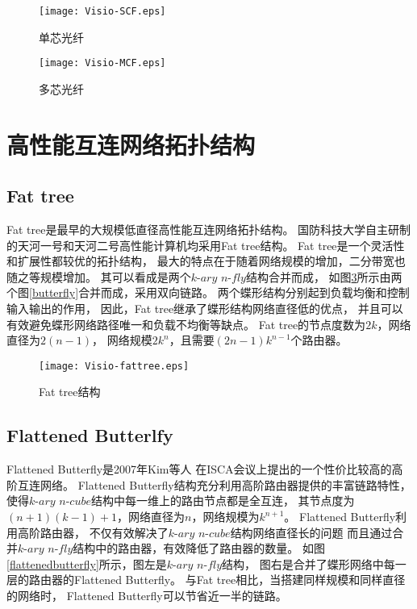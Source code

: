\begin{figure}[htp]
  \centering
    \texttt{[image: Visio-SCF.eps]}
    \caption{单芯光纤}
    \label{scf}
\end{figure}

\begin{figure}[htp]
  \centering
    \texttt{[image: Visio-MCF.eps]}
      \caption{多芯光纤}
       \label{mcf}
\end{figure}

\section{高性能互连网络拓扑结构}

\subsection{Fat tree}
Fat tree是最早的大规模低直径高性能互连网络拓扑结构。
国防科技大学自主研制的天河一号和天河二号高性能计算机均采用Fat tree结构。
Fat tree是一个灵活性和扩展性都较优的拓扑结构，
最大的特点在于随着网络规模的增加，二分带宽也随之等规模增加。
其可以看成是两个$k\textrm{-}ary$ $n\textrm{-}fly$结构合并而成，
如图\ref{fattree}所示由两个图\ref{butterfly}合并而成，采用双向链路。
两个蝶形结构分别起到负载均衡和控制输入输出的作用，
因此，Fat tree继承了蝶形结构网络直径低的优点，
并且可以有效避免蝶形网络路径唯一和负载不均衡等缺点。
Fat tree的节点度数为$2k$，网络直径为$2(n-1)$，
网络规模$2k^n$，且需要$(2n-1)k^{n-1}$个路由器。
\begin{figure}[htp]
  \centering
    \texttt{[image: Visio-fattree.eps]}
    \caption{Fat tree结构}
     \label{fattree}
\end{figure}

\subsection{Flattened Butterlfy}

Flattened Butterfly是2007年Kim等人
在ISCA会议上提出的一个性价比较高的高阶互连网络。
Flattened Butterfly结构充分利用高阶路由器提供的丰富链路特性，
使得$k\textrm{-}ary$ $n\textrm{-}cube$结构中每一维上的路由节点都是全互连，
其节点度为$(n+1)(k-1)+1$，网络直径为$n$，网络规模为$k^{n+1}$。
Flattened Butterfly利用高阶路由器，
不仅有效解决了$k\textrm{-}ary$ $n\textrm{-}cube$结构网络直径长的问题
而且通过合并$k\textrm{-}ary$ $n\textrm{-}fly$结构中的路由器，有效降低了路由器的数量。
如图\ref{flattenedbutterfly}所示，图左是$k\textrm{-}ary$ $n\textrm{-}fly$结构，
图右是合并了蝶形网络中每一层的路由器的Flattened Butterfly。
与Fat tree相比，当搭建同样规模和同样直径的网络时，
Flattened Butterfly可以节省近一半的链路。

